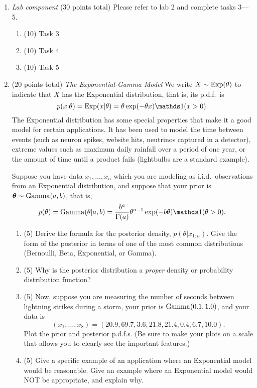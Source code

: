 \documentclass{article}
\begin{document}
\begin{enumerate}
\item {\em Lab component} %
  (30 points total) Please refer to lab 2 and complete tasks 3---5. 
  \begin{enumerate}
  \item (10) Task 3
  \item (10) Task 4
  \item (10) Task 5
  \end{enumerate}
  
  
\item (20  points total) {\em The Exponential-Gamma Model}
We write $X\sim\operatorname*{Exp}(\theta)$ to indicate that $X$ has the Exponential distribution, that is, its p.d.f.\ is
$$ p(x|\theta) =\Exp(x|\theta) = \theta\exp(-\theta x)\I(x>0). $$
The Exponential distribution has some special properties that make it a good model for certain applications. It has been used to model the time between events (such as neuron spikes, website hits, neutrinos captured in a detector), extreme values such as maximum daily rainfall over a period of one year, or the amount of time until a product fails (lightbulbs are a standard example).

Suppose you have data $x_1,\dotsc,x_n$ which you are modeling as i.i.d.\ observations from an Exponential distribution, and suppose that your prior is ${\bm\theta}\sim\operatorname*{Gamma}(a,b)$, that is,
$$ p(\theta) = \Ga(\theta|a,b) = \frac{b^a}{\Gamma(a)}\theta^{a-1}\exp(-b\theta) \I(\theta>0). $$

\begin{enumerate}
\item (5) Derive the formula for the posterior density, $p(\theta|x_{1:n})$. Give the form of the posterior in terms of one of the most common distributions (Bernoulli, Beta, Exponential, or Gamma).
\item (5) Why is the posterior distribution a \emph{proper} density or probability distribution function? 
\item (5) Now, suppose you are measuring the number of seconds between lightning strikes during a storm, your prior is $\operatorname*{Gamma}(0.1,1.0)$, and your data is
$$(x_1,\dotsc,x_8) = (20.9, 69.7, 3.6, 21.8, 21.4, 0.4, 6.7, 10.0).$$
Plot the prior and posterior p.d.f.s. (Be sure to make your plots on a scale that allows you to clearly see the important features.)
\item (5) Give a specific example of an application where an Exponential model would be reasonable. Give an example where an Exponential model would NOT be appropriate, and explain why.
\end{enumerate}


\end{enumerate}
\end{document}
